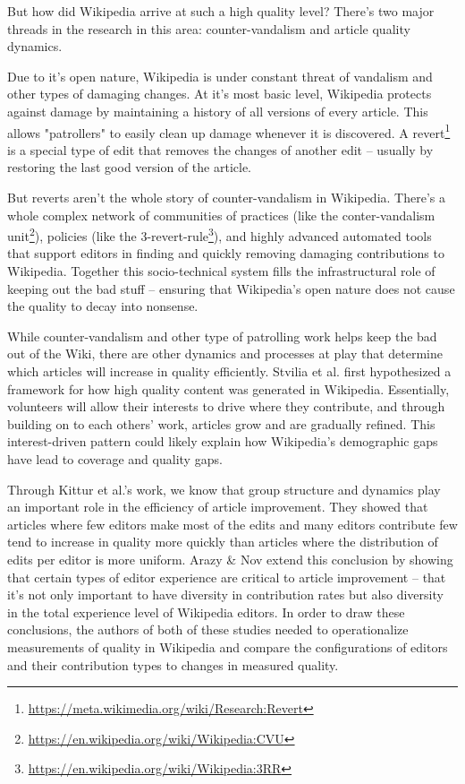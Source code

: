 But how did Wikipedia arrive at such a high quality level?  There's two major threads in the research in this area: counter-vandalism and article quality dynamics.

 Due to it's open nature, Wikipedia is under constant threat of vandalism and other types of damaging changes.  At it's most basic level, Wikipedia protects against damage by maintaining a history of all versions of every article.  This allows "patrollers" to easily clean up damage whenever it is discovered.  A revert\footnote{\url{https://meta.wikimedia.org/wiki/Research:Revert}} is a special type of edit that removes the changes of another edit -- usually by restoring the last good version of the article.

But reverts aren't the whole story of counter-vandalism in Wikipedia.  There's a whole complex network of communities of practices (like the conter-vandalism unit\footnote{\url{https://en.wikipedia.org/wiki/Wikipedia:CVU}}), policies (like the 3-revert-rule\footnote{\url{https://en.wikipedia.org/wiki/Wikipedia:3RR}}), and highly advanced automated tools that support editors in finding and quickly removing damaging contributions to Wikipedia\cite{geiger10work}\cite{priedhorsky07creating}.  Together this socio-technical system fills the infrastructural role of keeping out the bad stuff -- ensuring that Wikipedia's open nature does not cause the quality to decay into nonsense.

 While counter-vandalism and other type of patrolling work helps keep the bad out of the Wiki, there are other dynamics and processes at play that determine which articles will increase in quality efficiently.  Stvilia et al. first hypothesized a framework for how high quality content was generated in Wikipedia\cite{stvilia08information}.   Essentially, volunteers will allow their interests to drive where they contribute, and through building on to each others' work, articles grow and are gradually refined.  This interest-driven pattern could likely explain how Wikipedia's demographic gaps have lead to coverage and quality gaps\cite{lam11clubhouse}.

Through Kittur et al.'s work, we know that group structure and dynamics play an important role in the efficiency of article improvement.  They showed that articles where few editors make most of the edits and many editors contribute few tend to increase in quality more quickly than articles where the distribution of edits per editor is more uniform\cite{kittur08harnessing}.  Arazy \& Nov extend this conclusion by showing that certain types of editor experience are critical to article improvement -- that it's not only important to have diversity in contribution rates but also diversity in the total experience level of Wikipedia editors\cite{arazy10determinants}.  In order to draw these conclusions, the authors of both of these studies needed to operationalize measurements of quality in Wikipedia and compare the configurations of editors and their contribution types to changes in measured quality.
